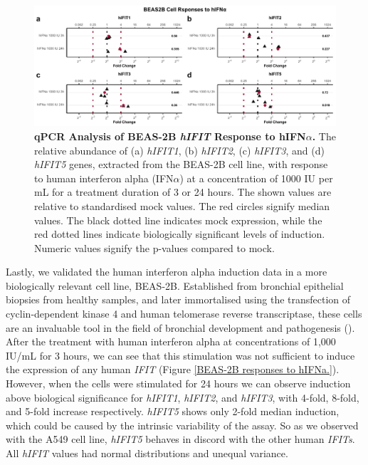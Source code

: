 \begin{figure}
    \centering
    \includegraphics[width=1\linewidth]{06. Chapter 1/Figs/01. Induction/09. beas2b_ifna.pdf}
    \caption[qPCR Analysis of BEAS-2B \textit{hIFIT} Response to hIFN\(\alpha\).]{\textbf{qPCR Analysis of BEAS-2B \textit{hIFIT} Response to hIFN\(\alpha\).} The relative abundance of (a) \textit{hIFIT1}, (b) \textit{hIFIT2}, (c) \textit{hIFIT3}, and (d) \textit{hIFIT5} genes, extracted from the BEAS-2B cell line, with response to human interferon alpha (IFN\(\alpha\)) at a concentration of 1000 IU per mL for a treatment duration of 3 or 24 hours. The shown values are relative to standardised mock values. The red circles signify median values. The black dotted line indicates mock expression, while the red dotted lines indicate biologically significant levels of induction. Numeric values signify the p-values compared to mock.}
    \label{BEAS-2B responses to hIFNa}
\end{figure}

Lastly, we validated the human interferon alpha induction data in a more biologically relevant cell line, BEAS-2B. Established from bronchial epithelial biopsies from healthy samples, and later immortalised using the transfection of cyclin-dependent kinase 4 and human telomerase reverse transcriptase, these cells are an invaluable tool in the field of bronchial development and pathogenesis (\cite{Ramirez2004ImmortalizationOncoproteins}). After the treatment with human interferon alpha at concentrations of 1,000 IU/mL for 3 hours, we can see that this stimulation was not sufficient to induce the expression of any human \textit{IFIT} (Figure \ref{BEAS-2B responses to hIFNa.}). However, when the cells were stimulated for 24 hours we can observe induction above biological significance for \textit{hIFIT1}, \textit{hIFIT2}, and \textit{hIFIT3}, with 4-fold, 8-fold, and 5-fold increase respectively. \textit{hIFIT5} shows only 2-fold median induction, which could be caused by the intrinsic variability of the assay. So as we observed with the A549 cell line, \textit{hIFIT5} behaves in discord with the other human \textit{IFITs}. All \textit{hIFIT} values had normal distributions and unequal variance.


